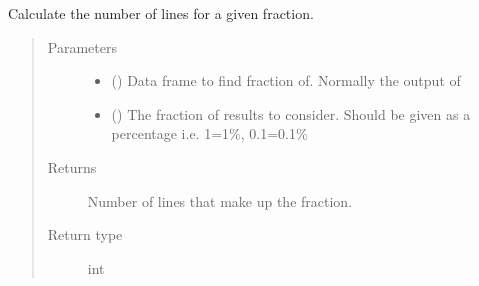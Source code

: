 \documentclass[letterpaper,10pt,english]{sphinxmanual}
\begin{document}
\begin{fulllineitems}
\label{\detokenize{misc:bayescmd.results_handling.frac_calculator}}
Calculate the number of lines for a given fraction.
\begin{quote}\begin{description}
\item[{Parameters}] \leavevmode\begin{itemize}
\item {} 
 () \textendash{} Data frame to find fraction of. Normally the output of
{\hyperref[\detokenize{misc:bayescmd.results_handling.data_import}]{}}

\item {} 
 () \textendash{} The fraction of results to consider. Should be given as a percentage
i.e. 1=1\%, 0.1=0.1\%

\end{itemize}

\item[{Returns}] \leavevmode
Number of lines that make up the fraction.

\item[{Return type}] \leavevmode
int

\end{description}\end{quote}

\end{fulllineitems}

\end{document}
